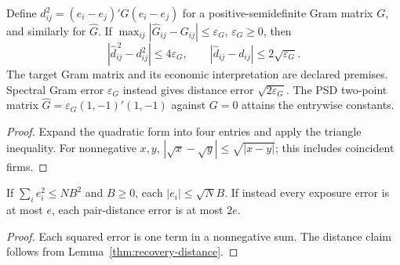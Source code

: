 \begin{theorem}\label{thm:gram-distance}
  \leanok
  Define $d_{ij}^2=(e_i-e_j)'G(e_i-e_j)$ for a positive-semidefinite
  Gram matrix $G$, and similarly for $\widehat G$. If
  $\max_{ij}|\widehat G_{ij}-G_{ij}|\le\varepsilon_G$, $\varepsilon_G\ge0$,
  then
  \[
    |\widehat d_{ij}^{\,2}-d_{ij}^2|\le4\varepsilon_G,
    \qquad |\widehat d_{ij}-d_{ij}|\le2\sqrt{\varepsilon_G}.
  \]
  The target Gram matrix and its economic interpretation are declared premises.
  Spectral Gram error $\varepsilon_G$ instead gives distance error
  $\sqrt{2\varepsilon_G}$. The PSD two-point matrix
  $\widehat G=\varepsilon_G(1,-1)'(1,-1)$ against $G=0$ attains the
  entrywise constants.
\end{theorem}
\begin{proof}\leanok
  Expand the quadratic form into four entries and apply the triangle
  inequality. For nonnegative $x,y$, $|\sqrt x-\sqrt y|\le\sqrt{|x-y|}$;
  this includes coincident firms.
\end{proof}

\begin{lemma}\label{thm:panel-rms-uniform}
  \leanok
  If $\sum_i e_i^2\le NB^2$ and $B\ge0$, each $|e_i|\le\sqrt N B$.
  If instead every exposure error is at most $e$, each pair-distance error
  is at most $2e$.
\end{lemma}
\begin{proof}\leanok
  Each squared error is one term in a nonnegative sum. The distance claim
  follows from Lemma~\ref{thm:recovery-distance}.
\end{proof}

